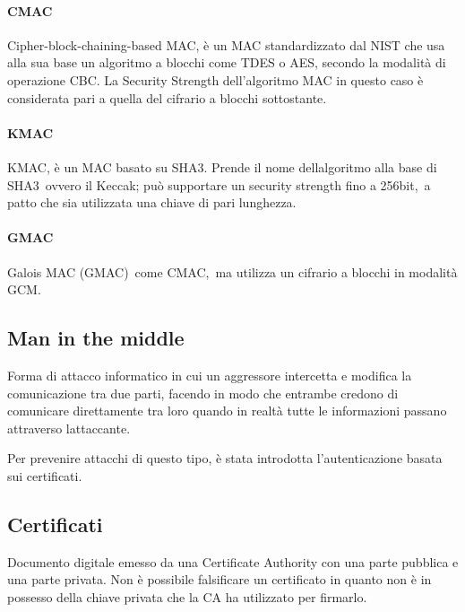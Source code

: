 \documentclass[
]{article}
\begin{document}
\paragraph{\texorpdfstring{{CMAC}}{CMAC}}\label{h.5amglev0byb5}

{Cipher-block-chaining-based MAC, è un MAC standardizzato dal NIST che
usa alla sua base un algoritmo a blocchi come TDES o AES, secondo la
modalità di operazione CBC. La Security Strength dell'algoritmo MAC in
questo caso è considerata pari a quella del cifrario a blocchi
sottostante. }

\paragraph{\texorpdfstring{{KMAC}}{KMAC}}\label{h.mmmw4375tbiy}

{KMAC, è un MAC basato su SHA3. Prende il nome
dell\textquotesingle algoritmo alla base di }{SHA3}{~ovvero il Keccak;
può supportare un security strength fino a }{256bit,}{~a patto che sia
utilizzata una chiave di pari lunghezza. }

\paragraph{\texorpdfstring{{GMAC}}{GMAC}}\label{h.9b7uvth23sig}

{Galois MAC }{(GMAC)}{~come }{CMAC,}{~ma utilizza un cifrario a blocchi
in modalità GCM.}

{}

\subsection{\texorpdfstring{{Man in the
middle}}{Man in the middle}}\label{h.youamsebvdbm}

{Forma di attacco informatico in cui un aggressore intercetta e modifica
la comunicazione tra due parti, facendo in modo che entrambe credono di
comunicare direttamente tra loro quando in realtà tutte le informazioni
passano attraverso l\textquotesingle attaccante.}

{Per prevenire attacchi di questo tipo, è stata introdotta
l'autenticazione basata sui certificati.}

\subsection{\texorpdfstring{{Certificati}}{Certificati}}\label{h.35ir2di1v5oa}

{Documento digitale emesso da una Certificate Authority con una parte
pubblica e una parte privata. Non è possibile falsificare un certificato
in quanto non è in possesso della chiave privata che la CA ha utilizzato
per firmarlo.}
\end{document}
